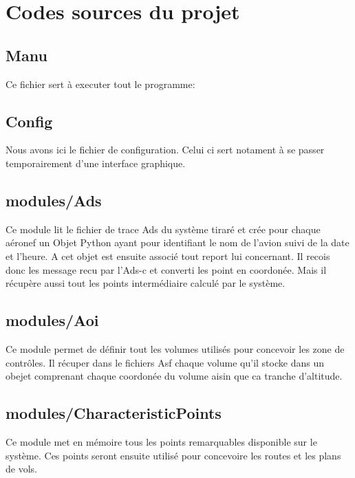 \section{Codes sources du projet}
    \subsection{Manu\label{pyManu}}
Ce fichier sert à executer tout le programme:
\newpage

    \subsection{Config\label{pyConfig}}
Nous avons ici le fichier de configuration. Celui ci sert notament à se passer temporairement d'une interface graphique.
\newpage

    \subsection{modules/Ads\label{pyAds}} 
Ce module lit le fichier de trace Ads du système tiraré et crée pour chaque aéronef un Objet Python ayant pour identifiant le nom de l'avion suivi de la date et l'heure. A cet objet est ensuite associé tout report lui concernant. Il recois donc les message recu par l'Ads-c et converti les point en coordonée. Mais il récupère aussi tout les points intermédiaire calculé par le système.
\newpage


    \subsection{modules/Aoi\label{pyAoi}} 
Ce module permet de définir tout les volumes utilisés pour concevoir les zone de contrôles. Il récuper dans le fichiers Asf chaque volume qu'il stocke dans un obejet comprenant chaque coordonée du volume aisin que ca tranche d'altitude.
\newpage

    \subsection{modules/CharacteristicPoints\label{pyCP}}
Ce module met en mémoire tous les points remarquables disponible sur le système. Ces points seront ensuite utilisé pour concevoire les routes et les plans de vols.
\newpage

